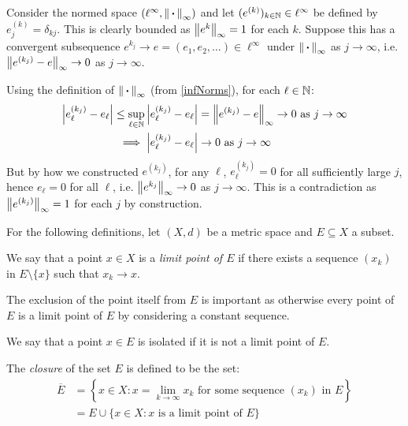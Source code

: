 \documentclass[../main.tex]{subfiles}
\begin{document}
\begin{example} \label{RnCauchyCE}
  Consider the normed space $(\ell^{\infty}, \left\lVert {\hspace{0.18em}\boldsymbol{\cdot}\hspace{0.18em}} \right\rVert_{\infty})$ and let $(e^{(k)})_{k \in \mathbb{N}} \in \ell^{\infty}$ be defined by $e^{(k)}_j = \delta_{k j}$.
  This is clearly bounded as $\left\lVert e^{k} \right\rVert_{\infty} = 1$ for each $k$.
  Suppose this has a convergent subsequence $e^{k_{j}} \to e = (e_1, e_2, \ldots) \in \ell^{\infty}$ under $\left\lVert {\hspace{0.18em}\boldsymbol{\cdot}\hspace{0.18em}} \right\rVert_{\infty}$ as $j\to \infty$, i.e. $\left\lVert e^{(k_j)} - e \right\rVert_{\infty} \to 0$ as $j \to \infty$.

  Using the definition of $\left\lVert {\hspace{0.18em}\boldsymbol{\cdot}\hspace{0.18em}} \right\rVert_{\infty}$ (from \cref{infNorms}), for each $\ell \in \mathbb{N}$:
  \begin{align*}
    \left\lvert e^{(k_j)}_{\ell} - e_{\ell} \right\rvert \leq \sup_{\ell \in \mathbb{N}} \left\lvert e^{(k_j)}_{\ell} - e_{\ell} \right\rvert &= \left\lVert e^{(k_j)} - e \right\rVert_{\infty} \to 0 \text{ as } j \to \infty \\
    \implies \left\lvert e^{(k_j)}_{\ell} - e_{\ell} \right\rvert &\to 0 \text{ as } j \to \infty
  \end{align*}
  But by how we constructed $e^{(k_j)}$, for any $\ell$, $e^{(k_{j})}_{\ell} = 0$ for all sufficiently large $j$, hence $e_{\ell} = 0$ for all $\ell$, i.e. $\left\lVert e^{k_j} \right\rVert_{\infty} \to 0$ as $j \to \infty$.
  This is a contradiction as $\left\lVert e^{(k_j)} \right\rVert_{\infty} = 1$ for each $j$ by construction.
\end{example}
For the following definitions, let $(X, d)$ be a metric space and $E \subseteq X$ a subset.
\begin{definition}
  We say that a point $x \in X$ is a \textit{limit point of $E$} if there exists a sequence $(x_k)$ in $E \setminus \{x\}$ such that $x_k \to x$.
\end{definition}
\begin{remark}
  The exclusion of the point itself from $E$ is important as otherwise every point of $E$ is a limit point of $E$ by considering a constant sequence.
\end{remark}
\begin{definition}
  We say that a point $x \in E$ is isolated if it is not a limit point of $E$.
\end{definition}
\begin{definition}[Closure]
  The \textit{closure} of the set $E$ is defined to be the set:
  \begin{align*}
    \overline{E} &= \left\{x \in X: x  = \lim_{k \to \infty} x_k \text{ for some sequence $(x_k)$ in $E$}\right\} \\
                 &= E \cup \{x \in X: x \text{ is a limit point of $E$}\}
  \end{align*}
\end{definition}
\end{document}
